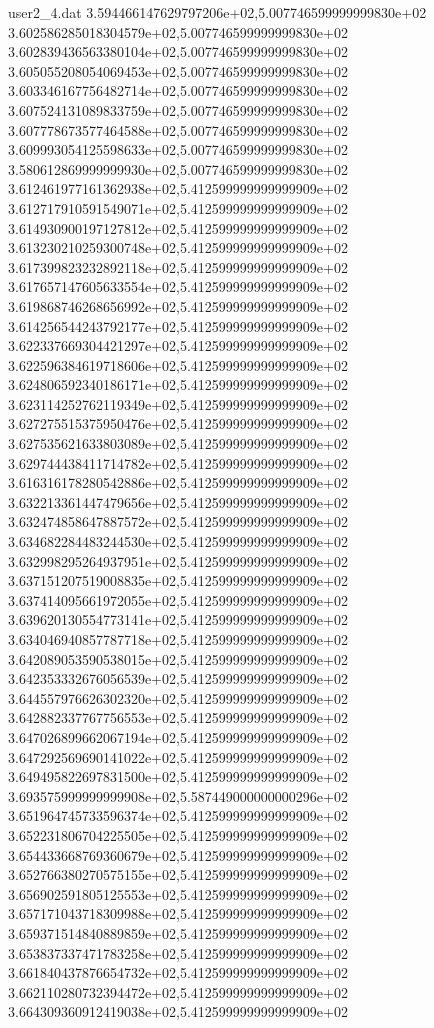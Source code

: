 \begin{filecontents}{user2_4.dat}
3.594466147629797206e+02,5.007746599999999830e+02
3.602586285018304579e+02,5.007746599999999830e+02
3.602839436563380104e+02,5.007746599999999830e+02
3.605055208054069453e+02,5.007746599999999830e+02
3.603346167756482714e+02,5.007746599999999830e+02
3.607524131089833759e+02,5.007746599999999830e+02
3.607778673577464588e+02,5.007746599999999830e+02
3.609993054125598633e+02,5.007746599999999830e+02
3.580612869999999930e+02,5.007746599999999830e+02
3.612461977161362938e+02,5.412599999999999909e+02
3.612717910591549071e+02,5.412599999999999909e+02
3.614930900197127812e+02,5.412599999999999909e+02
3.613230210259300748e+02,5.412599999999999909e+02
3.617399823232892118e+02,5.412599999999999909e+02
3.617657147605633554e+02,5.412599999999999909e+02
3.619868746268656992e+02,5.412599999999999909e+02
3.614256544243792177e+02,5.412599999999999909e+02
3.622337669304421297e+02,5.412599999999999909e+02
3.622596384619718606e+02,5.412599999999999909e+02
3.624806592340186171e+02,5.412599999999999909e+02
3.623114252762119349e+02,5.412599999999999909e+02
3.627275515375950476e+02,5.412599999999999909e+02
3.627535621633803089e+02,5.412599999999999909e+02
3.629744438411714782e+02,5.412599999999999909e+02
3.616316178280542886e+02,5.412599999999999909e+02
3.632213361447479656e+02,5.412599999999999909e+02
3.632474858647887572e+02,5.412599999999999909e+02
3.634682284483244530e+02,5.412599999999999909e+02
3.632998295264937951e+02,5.412599999999999909e+02
3.637151207519008835e+02,5.412599999999999909e+02
3.637414095661972055e+02,5.412599999999999909e+02
3.639620130554773141e+02,5.412599999999999909e+02
3.634046940857787718e+02,5.412599999999999909e+02
3.642089053590538015e+02,5.412599999999999909e+02
3.642353332676056539e+02,5.412599999999999909e+02
3.644557976626302320e+02,5.412599999999999909e+02
3.642882337767756553e+02,5.412599999999999909e+02
3.647026899662067194e+02,5.412599999999999909e+02
3.647292569690141022e+02,5.412599999999999909e+02
3.649495822697831500e+02,5.412599999999999909e+02
3.693575999999999908e+02,5.587449000000000296e+02
3.651964745733596374e+02,5.412599999999999909e+02
3.652231806704225505e+02,5.412599999999999909e+02
3.654433668769360679e+02,5.412599999999999909e+02
3.652766380270575155e+02,5.412599999999999909e+02
3.656902591805125553e+02,5.412599999999999909e+02
3.657171043718309988e+02,5.412599999999999909e+02
3.659371514840889859e+02,5.412599999999999909e+02
3.653837337471783258e+02,5.412599999999999909e+02
3.661840437876654732e+02,5.412599999999999909e+02
3.662110280732394472e+02,5.412599999999999909e+02
3.664309360912419038e+02,5.412599999999999909e+02

\end{filecontents}
